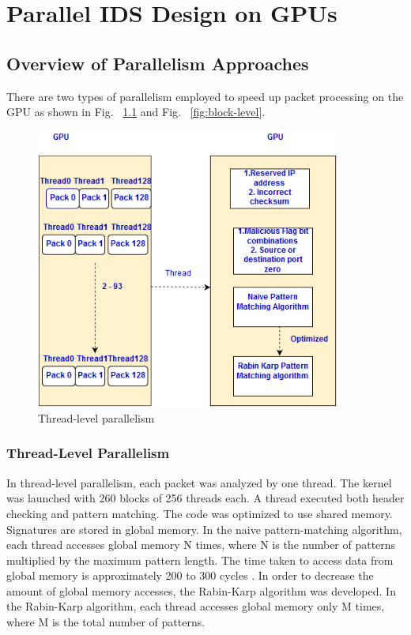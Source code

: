 \chapter{Parallel IDS Design on GPUs}
\vspace{\topsep} 
\section{Overview of Parallelism Approaches}
There are two types of parallelism employed to speed up packet processing on the GPU as shown in Fig. ~\ref{fig:thread-level} and Fig. ~\ref{fig:block-level}.
\begin{figure}[H]
	\centering
	\includegraphics[width=10cm]{threadlevel.png}
	\caption{Thread-level parallelism}
	\label{fig:thread-level}
\end{figure}
\squeezeup
\subsection{Thread-Level Parallelism}
In thread-level parallelism, each packet was analyzed by one thread. The kernel was launched with 260 blocks of 256 threads each. A thread executed both header checking and pattern matching. The code was optimized to use shared memory. Signatures are stored in global memory. In the naive pattern-matching algorithm, each thread accesses global memory N times, where N is the number of patterns multiplied by the maximum pattern length. The time taken to access data from global memory is approximately 200 to 300 cycles \cite{bib14}. In order to decrease the amount of global memory accesses, the Rabin-Karp algorithm was developed. In the Rabin-Karp algorithm, each thread accesses global memory only M times, where M is the total number of patterns. 
